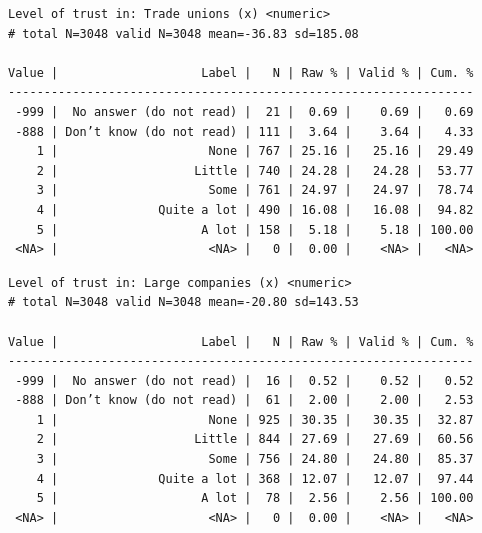 \documentclass[
  letterpaper,
  DIV=11,
  numbers=noendperiod]{scrreprt}
\newenvironment{Shaded}{\begin{snugshade}}{\end{snugshade}}
\newcommand{\FunctionTok}[1]{\textcolor[rgb]{0.28,0.35,0.67}{#1}}
\newcommand{\NormalTok}[1]{\textcolor[rgb]{0.00,0.23,0.31}{#1}}
\newcommand{\SpecialCharTok}[1]{\textcolor[rgb]{0.37,0.37,0.37}{#1}}
\begin{document}
\begin{Shaded}
\end{Shaded}

\begin{verbatim}
Level of trust in: Trade unions (x) <numeric> 
# total N=3048 valid N=3048 mean=-36.83 sd=185.08

Value |                    Label |   N | Raw % | Valid % | Cum. %
-----------------------------------------------------------------
 -999 |  No answer (do not read) |  21 |  0.69 |    0.69 |   0.69
 -888 | Don’t know (do not read) | 111 |  3.64 |    3.64 |   4.33
    1 |                     None | 767 | 25.16 |   25.16 |  29.49
    2 |                   Little | 740 | 24.28 |   24.28 |  53.77
    3 |                     Some | 761 | 24.97 |   24.97 |  78.74
    4 |              Quite a lot | 490 | 16.08 |   16.08 |  94.82
    5 |                    A lot | 158 |  5.18 |    5.18 | 100.00
 <NA> |                     <NA> |   0 |  0.00 |    <NA> |   <NA>
\end{verbatim}

\begin{Shaded}
\end{Shaded}

\begin{verbatim}
Level of trust in: Large companies (x) <numeric> 
# total N=3048 valid N=3048 mean=-20.80 sd=143.53

Value |                    Label |   N | Raw % | Valid % | Cum. %
-----------------------------------------------------------------
 -999 |  No answer (do not read) |  16 |  0.52 |    0.52 |   0.52
 -888 | Don’t know (do not read) |  61 |  2.00 |    2.00 |   2.53
    1 |                     None | 925 | 30.35 |   30.35 |  32.87
    2 |                   Little | 844 | 27.69 |   27.69 |  60.56
    3 |                     Some | 756 | 24.80 |   24.80 |  85.37
    4 |              Quite a lot | 368 | 12.07 |   12.07 |  97.44
    5 |                    A lot |  78 |  2.56 |    2.56 | 100.00
 <NA> |                     <NA> |   0 |  0.00 |    <NA> |   <NA>
\end{verbatim}

\begin{Shaded}
\end{Shaded}
\end{document}
